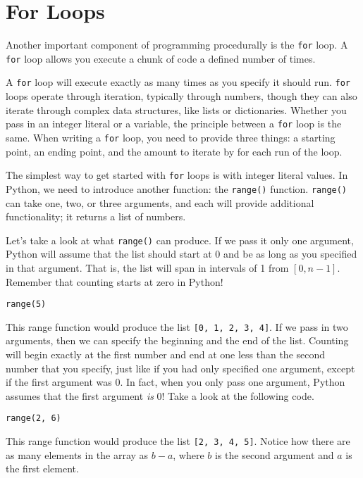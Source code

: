 \section{For Loops}
Another important component of programming procedurally is the \verb|for| loop. A \verb|for| loop allows you execute a chunk of code a defined number of times.\par
A \verb|for| loop will execute exactly as many times as you specify it should run. \verb|for| loops operate through iteration, typically through numbers, though they can also iterate through complex data structures, like lists or dictionaries. Whether you pass in an integer literal or a variable, the principle between a \verb|for| loop is the same. When writing a \verb|for| loop, you need to provide three things: a starting point, an ending point, and the amount to iterate by for each run of the loop.\par
The simplest way to get started with \verb|for| loops is with integer literal values. In Python, we need to introduce another function: the \verb|range()| function. \verb|range()| can take one, two, or three arguments, and each will provide additional functionality; it returns a list of numbers.\par
Let's take a look at what \verb|range()| can produce. If we pass it only one argument, Python will assume that the list should start at 0 and be as long as you specified in that argument. That is, the list will span in intervals of 1 from $[0, n-1]$. Remember that counting starts at zero in Python!\par
\begin{lstlisting}[style=pippython]
range(5)
\end{lstlisting}
This range function would produce the list \verb|[0, 1, 2, 3, 4]|. If we pass in two arguments, then we can specify the beginning and the end of the list. Counting will begin exactly at the first number and end at one less than the second number that you specify, just like if you had only specified one argument, except if the first argument was 0. In fact, when you only pass one argument, Python assumes that the first argument \textit{is} 0! Take a look at the following code.\par
\begin{lstlisting}[style=pippython]
range(2, 6)
\end{lstlisting}
This range function would produce the list \verb|[2, 3, 4, 5]|. Notice how there are as many elements in the array as $b - a$, where $b$ is the second argument and $a$ is the first element.\par
